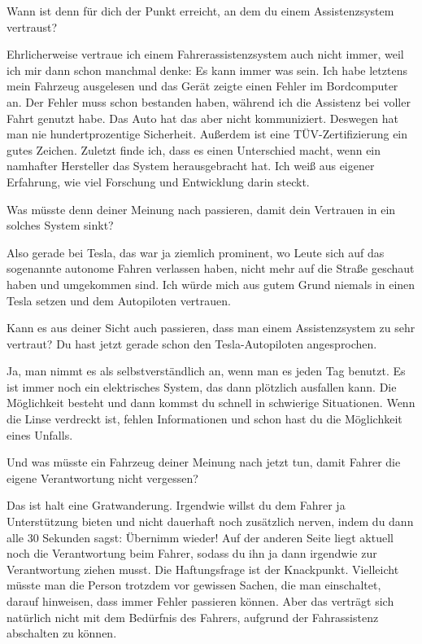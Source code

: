 \interviewerin
Wann ist denn für dich der Punkt erreicht, an dem du einem
Assistenzsystem vertraust?

Ehrlicherweise vertraue ich einem Fahrerassistenzsystem auch nicht
immer, weil ich mir dann schon manchmal denke: Es kann immer was sein.
Ich habe letztens mein Fahrzeug ausgelesen und das Gerät zeigte einen
Fehler im Bordcomputer an. Der Fehler muss schon bestanden haben,
während ich die Assistenz bei voller Fahrt genutzt habe. Das Auto hat
das aber nicht kommuniziert. Deswegen hat man nie hundertprozentige
Sicherheit. Außerdem ist eine TÜV-Zertifizierung ein gutes Zeichen.
Zuletzt finde ich, dass es einen Unterschied macht, wenn ein namhafter
Hersteller das System herausgebracht hat. Ich weiß aus eigener Erfahrung,
wie viel Forschung und Entwicklung darin steckt.

\interviewerin
Was müsste denn deiner Meinung nach passieren, damit dein Vertrauen in
ein solches System sinkt?

Also gerade bei Tesla, das war ja ziemlich prominent, wo Leute sich auf
das sogenannte autonome Fahren verlassen haben, nicht mehr auf die
Straße geschaut haben und umgekommen sind. Ich würde mich aus gutem
Grund niemals in einen Tesla setzen und dem Autopiloten vertrauen.

\interviewerin
Kann es aus deiner Sicht auch passieren, dass man einem Assistenzsystem
zu sehr vertraut? Du hast jetzt gerade schon den Tesla-Autopiloten
angesprochen.

Ja, man nimmt es als selbstverständlich an, wenn man es jeden Tag
benutzt. Es ist immer noch ein elektrisches System, das dann plötzlich
ausfallen kann. Die Möglichkeit besteht und dann kommst du schnell in
schwierige Situationen. Wenn die Linse verdreckt ist, fehlen
Informationen und schon hast du die Möglichkeit eines Unfalls.

\interviewerin
Und was müsste ein Fahrzeug deiner Meinung nach jetzt tun, damit Fahrer
die eigene Verantwortung nicht vergessen?

Das ist halt eine Gratwanderung. Irgendwie willst du dem Fahrer ja
Unterstützung bieten und nicht dauerhaft noch zusätzlich nerven, indem
du dann alle 30 Sekunden sagst: Übernimm wieder! Auf der anderen Seite
liegt aktuell noch die Verantwortung beim Fahrer, sodass du ihn ja dann
irgendwie zur Verantwortung ziehen musst. Die Haftungsfrage ist der
Knackpunkt. Vielleicht müsste man die Person trotzdem vor gewissen
Sachen, die man einschaltet, darauf hinweisen, dass immer Fehler
passieren können. Aber das verträgt sich natürlich nicht mit dem
Bedürfnis des Fahrers, aufgrund der Fahrassistenz abschalten zu können.

